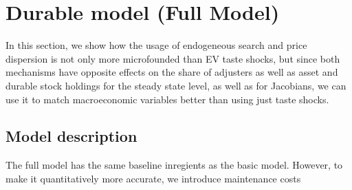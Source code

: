 \section{Durable model (Full Model)}\label{sec:DurableModel}

In this section, we show how the usage of endogeneous search and price dispersion is not only more microfounded than EV taste shocks, but since both mechanisms have opposite effects on the share of adjusters as well as asset and durable stock holdings for the steady state level, as well as for Jacobians, we can use it to match macroeconomic variables better than using just taste shocks.

\subsection{Model description}
The full model has the same baseline inregients as the basic model. However, to make it quantitatively more accurate, we introduce maintenance costs